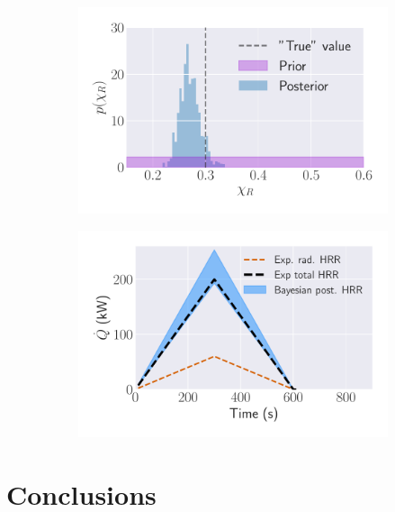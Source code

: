 \documentclass{article}
\begin{document}
\begin{figure}[htbp]
  \centering
  \begin{subfigure}[t]{.45\textwidth}
      \centering
      \includegraphics[width=\textwidth,keepaspectratio]{figures/bayes_distributions_300s_triangle.pdf}
      \caption{}
      \label{fig:backward_NN_examples}
  \end{subfigure}
  \begin{subfigure}[t]{.45\textwidth}
      \centering
      \includegraphics[width=\textwidth ,keepaspectratio]{figures/bayes_burner_result.pdf}
      \caption{}
      \label{fig:backward_error_scatter}
  \end{subfigure}
  \caption{} 
  \label{fig:bayes_results}
\end{figure}




\section{Conclusions}


\clearpage


\end{document}
